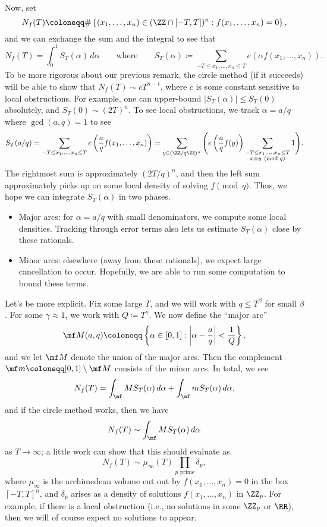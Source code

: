 \documentclass[../notes.tex]{subfiles}
\begin{document}
Now, set
\[N_f(T)\coloneqq\#\left\{(x_1,\ldots,x_n)\in(\ZZ\cap[-T,T])^n:f(x_1,\ldots,x_n)=0\right\},\]
and we can exchange the sum and the integral to see that
\[N_f(T)=\int_0^1S_T(\alpha)\,d\alpha\qquad\text{where}\qquad S_T(\alpha)\coloneqq\sum_{-T\le x_1,\ldots,x_n\le T}e(\alpha f(x_1,\ldots,x_n)).\]
To be more rigorous about our previous remark, the circle method (if it succeeds) will be able to show that $N_f(T)\sim cT^{n-t}$, where $c$ is some constant sensitive to local obstructions. For example, one can upper-bound $|S_T(\alpha)|\le S_T(0)$ absolutely, and $S_T(0)\sim(2T)^n$. To see local obstructions, we track $\alpha=a/q$ where $\gcd(a,q)=1$ to see
\[S_T(a/q)=\sum_{-T\le x_1,\ldots,x_n\le T}e\left(\frac aqf(x_1,\ldots,x_n)\right)=\sum_{y\in(\ZZ/q\ZZ)^n}\Bigg(e\left(\frac aqf(y)\right)\sum_{\substack{-T\le x_1,\ldots,x_n\le T\\x\equiv y\pmod q}}1\Bigg).\]
The rightmost sum is approximately $(2T/q)^n$, and then the left sum approximately picks up on some local density of solving $f\pmod q$. Thus, we hope we can integrate $S_T(\alpha)$ in two phases.
\begin{itemize}
	\item Major arcs: for $\alpha=a/q$ with small denominators, we compute some local densities. Tracking through error terms also lets us estimate $S_T(\alpha)$ close by these rationals.
	\item Minor arcs: elsewhere (away from these rationals), we expect large cancellation to occur. Hopefully, we are able to run some computation to bound these terms.
\end{itemize}
Let's be more explicit. Fix some large $T$, and we will work with $q\le T^\beta$ for small $\beta$. For some $\gamma\approx1$, we work with $Q\coloneqq T^\gamma$. We now define the ``major arc''
\[\mf M(a,q)\coloneqq\left\{\alpha\in[0,1]:\left|\alpha-\frac aq\right|<\frac1Q\right\},\]
and we let $\mf M$ denote the union of the major arcs. Then the complement $\mf m\coloneqq[0,1]\setminus\mf M$ consists of the minor arcs. In total, we see
\[N_f(T)=\int_\mf MS_T(\alpha)\,d\alpha+\int_\mf mS_T(\alpha)\,d\alpha,\]
and if the circle method works, then we have
\[N_f(T)\sim\int_\mf MS_T(\alpha)\,d\alpha\]
as $T\to\infty$; a little work can show that this should evaluate as
\[N_f(T)\sim\mu_\infty(T)\prod_{p\text{ prime}}\delta_p,\]
where $\mu_\infty$ is the archimedean volume cut out by $f(x_1,\ldots,x_n)=0$ in the box $[-T,T]^n$, and $\delta_p$ arises as a density of solutions $f(x_1,\ldots,x_n)$ in $\ZZ_p$. For example, if there is a local obstruction (i.e., no solutions in some $\ZZ_p$ or $\RR$), then we will of course expect no solutions to appear.
\end{document}

